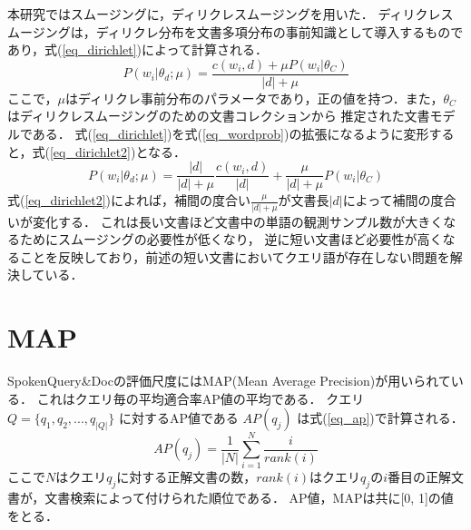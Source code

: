 本研究ではスムージングに，ディリクレスムージング\cite{smoothing2}を用いた．
ディリクレスムージングは，ディリクレ分布を文書多項分布の事前知識として導入するものであり，式(\ref{eq_dirichlet})によって計算される．
\begin{equation}
    P(w_i|\theta_d;\mu) = \frac{ c(w_i, d) + \mu P(w_i|\theta_C) }{ |d| + \mu } \label{eq_dirichlet}
\end{equation}
ここで，$\mu$はディリクレ事前分布のパラメータであり，正の値を持つ．また，$\theta_C$はディリクレスムージングのための文書コレクションから
推定された文書モデルである．
式(\ref{eq_dirichlet})を式(\ref{eq_wordprob})の拡張になるように変形すると，式(\ref{eq_dirichlet2})となる．
\begin{equation}
    P(w_i|\theta_d;\mu) = \frac{|d|}{|d|+\mu} \frac{c(w_i, d)}{|d|} + \frac{\mu}{|d|+\mu}P(w_i|\theta_C)  \label{eq_dirichlet2}
\end{equation}
式(\ref{eq_dirichlet2})によれば，補間の度合い$\frac{\mu}{|d|+\mu}$が文書長$|d|$によって補間の度合いが変化する．
これは長い文書ほど文書中の単語の観測サンプル数が大きくなるためにスムージングの必要性が低くなり，
逆に短い文書ほど必要性が高くなることを反映しており，前述の短い文書においてクエリ語が存在しない問題を解決している．

\section{MAP} \label{sec_map}
SpokenQuery\&Docの評価尺度にはMAP(Mean Average Precision)が用いられている．
これはクエリ毎の平均適合率AP値の平均である．
クエリ $Q = \{q_1, q_2, ..., q_{|Q|}\}$ に対するAP値である $AP(q_j)$ は式(\ref{eq_ap})で計算される．
\begin{equation}
    AP(q_j) = \frac{1}{|N|} \sum^N_{i=1} \frac{i}{rank(i)}    \label{eq_ap}
\end{equation}
ここで$N$はクエリ$q_j$に対する正解文書の数，$rank(i)$はクエリ$q_j$の$i$番目の正解文書が，文書検索によって付けられた順位である．
AP値，MAPは共に[0, 1]の値をとる．
